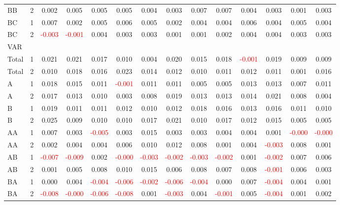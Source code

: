 \begin{table}[!htb]
{\begin{tabular}{llcccccccccccc}
BB & 2 & 0.002 & 0.005 & 0.005 & 0.005 & 0.004 & 0.003 & 0.007 & 0.007 & 0.004 & 0.003 & 0.001 & 0.003\\
BC & 1 & 0.007 & 0.002 & 0.005 & 0.006 & 0.005 & 0.002 & 0.004 & 0.004 & 0.006 & 0.004 & 0.005 & 0.004\\
BC & 2 & \textcolor{red}{-0.003} & \textcolor{red}{-0.001} & 0.004 & 0.003 & 0.003 & 0.001 & 0.001 & 0.002 & 0.004 & 0.004 & 0.003 & 0.003\\
\hline
VAR &  &  &  &  &  &  &  &  &  &  &  &  & \\
\hline
Total & 1 & 0.021 & 0.021 & 0.017 & 0.010 & 0.004 & 0.020 & 0.015 & 0.018 & \textcolor{red}{-0.001} & 0.019 & 0.009 & 0.009\\
Total & 2 & 0.010 & 0.018 & 0.016 & 0.023 & 0.014 & 0.012 & 0.010 & 0.011 & 0.012 & 0.011 & 0.001 & 0.016\\
A & 1 & 0.018 & 0.015 & 0.011 & \textcolor{red}{-0.001} & 0.011 & 0.011 & 0.005 & 0.005 & 0.013 & 0.013 & 0.007 & 0.011\\
A & 2 & 0.017 & 0.013 & 0.010 & 0.003 & 0.008 & 0.019 & 0.013 & 0.013 & 0.014 & 0.021 & 0.008 & 0.004\\
B & 1 & 0.019 & 0.011 & 0.011 & 0.012 & 0.010 & 0.012 & 0.018 & 0.016 & 0.013 & 0.016 & 0.011 & 0.010\\
B & 2 & 0.025 & 0.009 & 0.010 & 0.010 & 0.017 & 0.021 & 0.010 & 0.017 & 0.012 & 0.015 & 0.005 & 0.005\\
AA & 1 & 0.007 & 0.003 & \textcolor{red}{-0.005} & 0.003 & 0.015 & 0.003 & 0.003 & 0.004 & 0.004 & 0.001 & \textcolor{red}{-0.000} & \textcolor{red}{-0.000}\\
AA & 2 & 0.002 & 0.004 & 0.004 & 0.006 & 0.010 & 0.012 & 0.008 & 0.001 & 0.004 & \textcolor{red}{-0.003} & 0.008 & 0.001\\
AB & 1 & \textcolor{red}{-0.007} & \textcolor{red}{-0.009} & 0.002 & \textcolor{red}{-0.000} & \textcolor{red}{-0.003} & \textcolor{red}{-0.002} & \textcolor{red}{-0.003} & \textcolor{red}{-0.002} & 0.001 & \textcolor{red}{-0.002} & 0.007 & 0.006\\
AB & 2 & 0.001 & 0.005 & 0.008 & 0.010 & 0.015 & 0.006 & 0.008 & 0.007 & 0.008 & \textcolor{red}{-0.001} & 0.006 & 0.003\\
BA & 1 & 0.000 & 0.004 & \textcolor{red}{-0.004} & \textcolor{red}{-0.006} & \textcolor{red}{-0.002} & \textcolor{red}{-0.006} & \textcolor{red}{-0.004} & 0.000 & 0.007 & \textcolor{red}{-0.004} & 0.004 & 0.001\\
BA & 2 & \textcolor{red}{-0.008} & \textcolor{red}{-0.000} & \textcolor{red}{-0.006} & \textcolor{red}{-0.008} & 0.001 & \textcolor{red}{-0.003} & 0.004 & \textcolor{red}{-0.001} & 0.005 & \textcolor{red}{-0.004} & 0.001 & 0.002\\

\end{tabular}}
\end{table}
